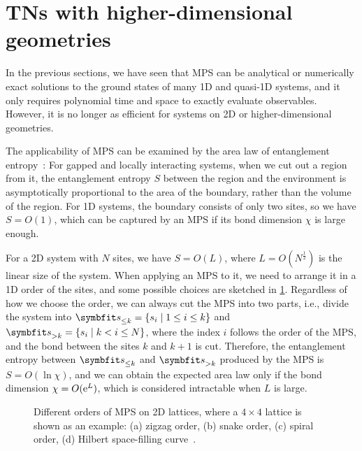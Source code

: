 \section{TNs with higher-dimensional geometries}

In the previous sections, we have seen that MPS can be analytical or numerically exact solutions to the ground states of many 1D and quasi-1D systems, and it only requires polynomial time and space to exactly evaluate observables. However, it is no longer as efficient for systems on 2D or higher-dimensional geometries.

The applicability of MPS can be examined by the area law of entanglement entropy~\cite{srednicki1993entropy, verstraete2006criticality, hastings2007area, eisert2010colloquium}: For gapped and locally interacting systems, when we cut out a region from it, the entanglement entropy $S$ between the region and the environment is asymptotically proportional to the area of the boundary, rather than the volume of the region. For 1D systems, the boundary consists of only two sites, so we have $S = O(1)$, which can be captured by an MPS if its bond dimension $\chi$ is large enough.

For a 2D system with $N$ sites, we have $S = O(L)$, where $L = O(N^\frac{1}{2})$ is the linear size of the system. When applying an MPS to it, we need to arrange it in a 1D order of the sites, and some possible choices are sketched in \cref{fig:mps-order}. Regardless of how we choose the order, we can always cut the MPS into two parts, i.e., divide the system into $\vs_{\le k} = \{s_i \mid 1 \le i \le k\}$ and $\vs_{> k} = \{s_i \mid k < i \le N\}$, where the index $i$ follows the order of the MPS, and the bond between the sites $k$ and $k + 1$ is cut. Therefore, the entanglement entropy between $\vs_{\le k}$ and $\vs_{> k}$ produced by the MPS is $S = O(\ln \chi)$, and we can obtain the expected area law only if the bond dimension $\chi = O(\mathrm{e}^L)$, which is considered intractable when $L$ is large.

\begin{figure}[htb]
\centering
\hspace*{\fill}
\hspace*{\fill}
\hspace*{\fill}
\hspace*{\fill}
\hspace*{\fill}
\caption[Orders of MPS on 2D lattice]{
Different orders of MPS on 2D lattices, where a $4 \times 4$ lattice is shown as an example: (a) zigzag order, (b) snake order, (c) spiral order, (d) Hilbert space-filling curve~\cite{hilbert1891uber}.
}
\label{fig:mps-order}
\end{figure}

